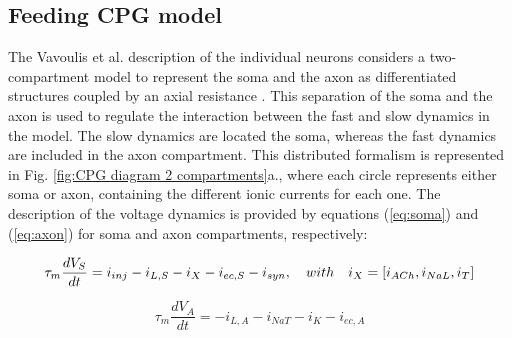 \subsection{Feeding CPG model}
The Vavoulis et al. description of the individual neurons considers a two-compartment model to represent the soma and the axon as  differentiated structures coupled by an axial resistance \cite{Vavoulis2007}. This separation of the soma and the axon is used to regulate the interaction between the fast and slow dynamics in the model. The slow dynamics are located the soma, whereas the fast dynamics are included in the axon compartment. This distributed formalism is represented in Fig. \ref{fig:CPG diagram 2 compartments}a., where each circle represents either soma or axon, containing the different ionic currents for each one. The description of the voltage dynamics is provided by equations (\ref{eq:soma}) and (\ref{eq:axon}) for soma and axon compartments, respectively: 

\begin{equation}
	\tau_m\frac{dV_S}{dt} = i_{inj} - i_{L,S} - i_X - i_{ec,S} - i_{syn} \\,
	\quad with \quad i_X = [i_{ACh},i_{NaL},i_T]
	\label{eq:soma}
\end{equation}

\begin{equation}
	\tau_m\frac{dV_A}{dt} = -i_{L,A} - i_{NaT} - i_K - i_{ec,A}
	\label{eq:axon}
\end{equation}


